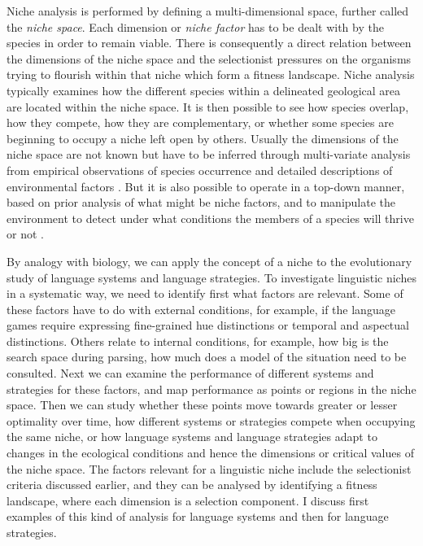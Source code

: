Niche analysis is performed by defining a multi-dimensional space, further called the {\itshape niche space}. Each 
dimension or {\itshape niche factor} has to be dealt with by the species in order to remain viable. There 
is consequently a direct
relation between the dimensions of the niche space and the selectionist pressures on the organisms trying to flourish 
within that niche which form a fitness landscape. Niche analysis
 typically examines how the different species within a delineated geological area 
are located within the niche space. It is then possible 
to see how species overlap, how they compete, how they are complementary, or whether some species are beginning
to occupy a niche left open by others. Usually the dimensions of the niche space are not known but have 
to be inferred through multi-variate analysis from empirical observations of species occurrence and 
detailed descriptions of environmental factors \citep{Elith:2009}.  But it is also possible to 
operate in a top-down manner, based on prior analysis of what might be niche factors, and to manipulate the environment 
to detect under what conditions the members of a species will thrive or not \citep{Nosil:2008}. 

By analogy with biology, we can apply the concept of a niche to the evolutionary study of
language systems and language strategies. To investigate linguistic niches in a systematic way, we need to identify first 
what factors are relevant. Some of these factors 
have to do with external conditions, for example, if the language games require expressing fine-grained hue distinctions or 
temporal and aspectual distinctions. Others relate to internal conditions, for example, how big is the search space during parsing, 
how much does a model of the situation need to be consulted. Next we can 
examine the performance of different systems and strategies for these factors, and map performance as 
points or regions in the niche space. Then we can study whether these points move towards greater or lesser optimality over time, 
how different systems or strategies compete when occupying the same niche, or how language systems and language 
strategies adapt to changes in the ecological conditions and hence the dimensions or critical values
of the niche space. The factors relevant for a linguistic niche include the selectionist criteria discussed earlier, 
and they can be analysed by identifying a fitness landscape, where each dimension is a selection component. 
I discuss first examples of this kind of analysis for language systems and then for language strategies.


